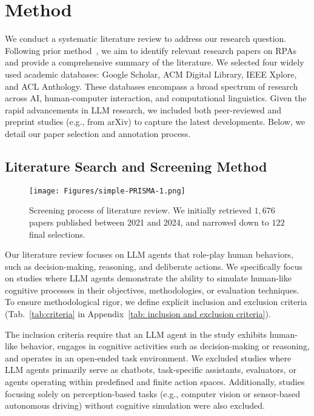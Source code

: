 \section{Method}

We conduct a systematic literature review to address our research question. Following prior method~\cite{nightingale2009guide}, we aim to identify relevant research papers on RPAs and provide a comprehensive summary of the literature. We selected four widely used academic databases: Google Scholar, ACM Digital Library, IEEE Xplore, and ACL Anthology. These databases encompass a broad spectrum of research across AI, human-computer interaction, and computational linguistics. Given the rapid advancements in LLM research, we included both peer-reviewed and preprint studies (e.g., from arXiv) to capture the latest developments. Below, we detail our paper selection and annotation process.



\subsection{Literature Search and Screening Method}

\begin{figure}
    \texttt{[image: Figures/simple-PRISMA-1.png]}
    \caption{Screening process of literature review. We initially retrieved $1,676$ papers published between 2021 and 2024, and narrowed down to $122$ final selections.}
    \vspace{-1em}
    \label{fig:prisma}
\end{figure}

Our literature review focuses on LLM agents that role-play human behaviors, such as decision-making, reasoning, and deliberate actions. We specifically focus on studies where LLM agents demonstrate the ability to simulate human-like cognitive processes in their objectives, methodologies, or evaluation techniques. To ensure methodological rigor, we define explicit inclusion and exclusion criteria (Tab.~\ref{tab:criteria} in Appendix~\ref{tab: inclusion and exclusion criteria}). 

The inclusion criteria require that an LLM agent in the study exhibits human-like behavior, engages in cognitive activities such as decision-making or reasoning, and operates in an open-ended task environment. We excluded studies where LLM agents primarily serve as chatbots, task-specific assistants, evaluators, or agents operating within predefined and finite action spaces. Additionally, studies focusing solely on perception-based tasks (e.g., computer vision or sensor-based autonomous driving) without cognitive simulation were also excluded.

